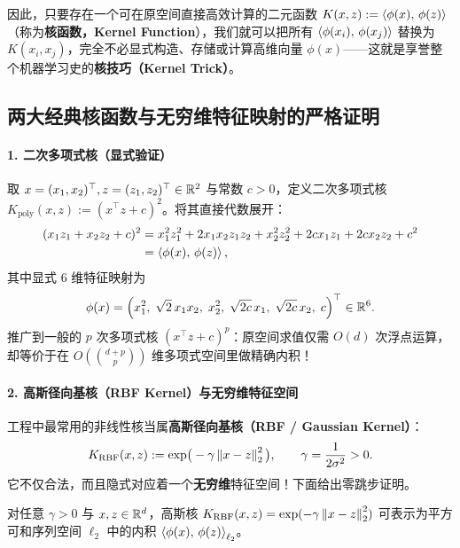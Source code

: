 因此，只要存在一个可在原空间直接高效计算的二元函数 $K(x, z) := \left\langle \phi(x),\, \phi(z) \right\rangle$（称为\textbf{核函数，Kernel Function}），我们就可以把所有 $\left\langle \phi(x_i),\, \phi(x_j) \right\rangle$ 替换为 $K(x_i, x_j)$，完全不必显式构造、存储或计算高维向量 $\phi(x)$——这就是享誉整个机器学习史的\textbf{核技巧（Kernel Trick）}。

\subsection{两大经典核函数与无穷维特征映射的严格证明}

\paragraph{1. 二次多项式核（显式验证）}
取 $x = (x_1, x_2)^\top, z = (z_1, z_2)^\top \in \mathbb{R}^2$ 与常数 $c > 0$，定义二次多项式核 $K_{\mathrm{poly}}(x, z) := (x^\top z + c)^2$。将其直接代数展开：
\begin{align*}
  (x_1 z_1 + x_2 z_2 + c)^2
  &= x_1^2 z_1^2 + 2 x_1 x_2 z_1 z_2 + x_2^2 z_2^2 + 2c x_1 z_1 + 2c x_2 z_2 + c^2 \\
  &= \left\langle \phi(x),\, \phi(z) \right\rangle,
\end{align*}
其中显式 6 维特征映射为
\[
  \phi(x) = \Big(x_1^2,\; \sqrt{2}\, x_1 x_2,\; x_2^2,\; \sqrt{2c}\, x_1,\; \sqrt{2c}\, x_2,\; c\Big)^\top \in \mathbb{R}^6.
\]
推广到一般的 $p$ 次多项式核 $(x^\top z + c)^p$：原空间求值仅需 $O(d)$ 次浮点运算，却等价于在 $O(\binom{d+p}{p})$ 维多项式空间里做精确内积！

\paragraph{2. 高斯径向基核（RBF Kernel）与无穷维特征空间}
工程中最常用的非线性核当属\textbf{高斯径向基核（RBF / Gaussian Kernel）}：
\[
  K_{\mathrm{RBF}}(x, z) := \exp\!\big(-\gamma \left\|x - z\right\|_2^2\big), \qquad \gamma = \frac{1}{2\sigma^2} > 0.
\]
它不仅合法，而且隐式对应着一个\textbf{无穷维}特征空间！下面给出零跳步证明。

\begin{thmBox}
\begin{theorem}\label{thm:rbf-inf}
对任意 $\gamma > 0$ 与 $x, z \in \mathbb{R}^d$，高斯核 $K_{\mathrm{RBF}}(x, z) = \exp(-\gamma\left\|x - z\right\|_2^2)$ 可表示为平方可和序列空间 $\ell_2$ 中的内积 $\left\langle \phi(x),\, \phi(z) \right\rangle_{\ell_2}$。
\end{theorem}
\end{thmBox}

